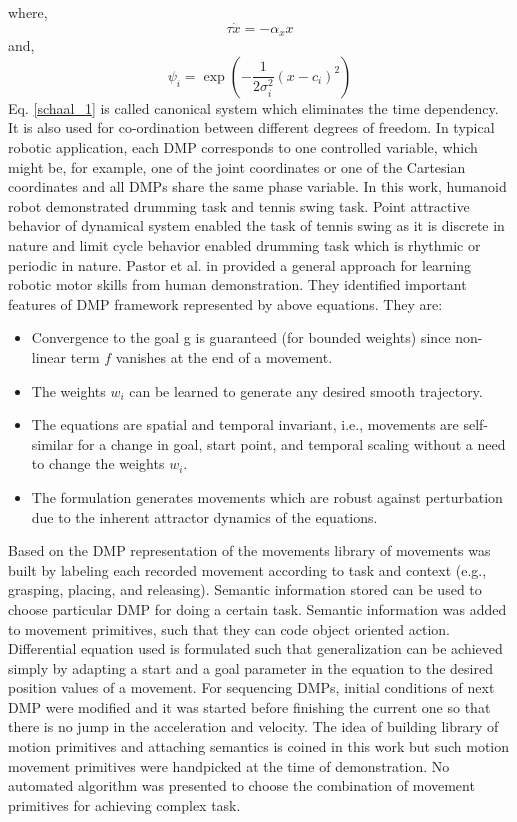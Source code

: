 where,
\begin{equation} \label{schaal_1}
\tau \dot{x} = -\alpha_{x}x
\end{equation}
and,
\begin{equation}
\psi_{i} = \exp(-{\frac{1}{2\sigma_{i}^{2}}(x - c_{i})^{2}})
\end{equation}
Eq. \ref{schaal_1} is called canonical system which eliminates the time dependency. It is also used for co-ordination between different degrees of freedom. In typical robotic application, each DMP corresponds to one controlled variable, which might be, for example, one of the joint coordinates or one of the Cartesian coordinates and all DMPs share the same phase variable. In this work, humanoid robot demonstrated drumming task and tennis swing task. Point attractive behavior of dynamical system enabled the task of tennis swing as it is discrete in nature and limit cycle behavior enabled drumming task which is rhythmic or periodic in nature.   
\newline
Pastor et al. in \cite{pastor2009learning} provided a general approach for learning robotic motor skills from human demonstration. They identified important features of DMP framework represented by above equations. They are:
\begin{itemize}
	\item Convergence to the goal g is guaranteed (for bounded weights) since non-linear term $f$ vanishes at the end of a movement.
	\item The weights $w_{i}$ can be learned to generate any desired smooth trajectory.
	\item The equations are spatial and temporal invariant, i.e., movements are self-similar for a change in goal, start point, and temporal scaling without a need to change the weights $w_{i}$.
	\item The formulation generates movements which are robust against perturbation due to the inherent attractor dynamics of the equations.
\end{itemize}
Based on the DMP representation of the movements library of movements was built by labeling each recorded movement according to task and context (e.g., grasping, placing, and releasing). Semantic information stored can be used to choose particular DMP for doing a certain task. Semantic information was added to movement primitives, such that they can code object oriented action. Differential equation used is formulated such that generalization can be achieved simply by adapting a start and a goal parameter in the equation to the desired position values of a movement. For sequencing DMPs, initial conditions of next DMP were modified and it was started before finishing the current one so that there is no jump in the acceleration and velocity. The idea of building library of motion primitives and attaching semantics is coined in this work but such motion movement primitives were handpicked at the time of demonstration. No automated algorithm was presented to choose the combination of movement primitives for achieving complex task. 
